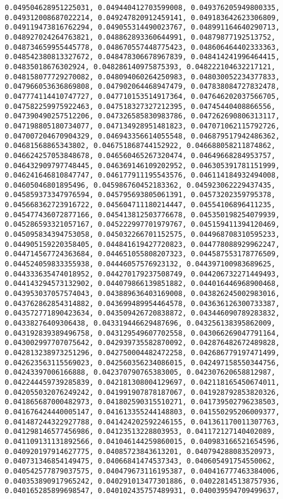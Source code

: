 \documentclass[11pt]{article}
\begin{document}
\begin{Verbatim}[commandchars=\\\{\}]
0.049504628951225031, 0.049440412703599008, 0.049376205949800335, 0.049312008687022214, 0.049247820912459141, 0.049183642623306809, 0.049119473816762294, 0.049055314490023767, 0.048991164640290713, 0.048927024264763821, 0.048862893360644991, 0.04879877192513752, 0.048734659955445778, 0.048670557448775423, 0.048606464402333363, 0.048542380813327672, 0.048478306678967839, 0.048414241996464415, 0.04835018676302924, 0.048286140975875393, 0.048222104632217121, 0.048158077729270082, 0.048094060264250983, 0.048030052234377833, 0.047966053636869808, 0.047902064468947479, 0.047838084727832478, 0.047774114410747727, 0.047710153514917364, 0.047646202037566705, 0.047582259975922463, 0.047518327327212395, 0.04745440408866556, 0.047390490257512206, 0.047326585830983786, 0.047262690806313117, 0.047198805180734077, 0.047134928951481823, 0.047071062115792726, 0.047007204670904329, 0.046943356614055548, 0.046879517942486362, 0.04681568865343802, 0.046751868744152922, 0.046688058211874862, 0.046624257053848678, 0.046560465267320474, 0.04649668284953757, 0.046432909797748445, 0.046369146109202952, 0.046305391781151999, 0.046241646810847747, 0.046177911195543576, 0.046114184932494008, 0.04605046801895496, 0.045986760452183362, 0.045923062229437435, 0.045859373347976594, 0.045795693805061391, 0.04573202359795378, 0.045668362723916722, 0.045604711180214447, 0.04554106896411235, 0.045477436072877166, 0.045413812503776678, 0.045350198254079939, 0.045286593321057167, 0.045222997701979767, 0.045159411394120469, 0.045095834394753058, 0.045032266701152575, 0.044968708310595233, 0.044905159220358405, 0.044841619427720823, 0.044778088929962247, 0.044714567724363684, 0.044651055808207323, 0.044587553178776509, 0.044524059833355938, 0.04446057576923132, 0.044397100983689625, 0.044333635474018952, 0.044270179237508749, 0.044206732271449493, 0.044143294573132902, 0.044079866139851882, 0.044016446968900468, 0.043953037057574043, 0.043889636403169008, 0.043826245002983016, 0.043762862854314882, 0.043699489954464578, 0.043636126300733387, 0.043572771890423634, 0.043509426720838872, 0.043446090789283832, 0.04338276409306438, 0.043319446629487696, 0.043256138395862009, 0.043192839389496758, 0.043129549607702558, 0.043066269047791164, 0.043002997707075642, 0.042939735582870092, 0.042876482672489828, 0.042813238973251296, 0.042750004482472258, 0.042686779197471499, 0.042623563115569023, 0.042560356234086015, 0.042497158550344756, 0.04243397006166888, 0.042370790765383005, 0.042307620658812987, 0.042244459739285839, 0.042181308004129697, 0.042118165450674011, 0.042055032076249242, 0.041991907878187067, 0.041928792853820326, 0.041865687000482973, 0.041802590315510271, 0.041739502796238503, 0.041676424440005147, 0.041613355244148803, 0.041550295206009377, 0.041487244322927788, 0.041424202592246155, 0.041361170011307763, 0.041298146577456986, 0.04123513228803953, 0.041172127140402089, 0.041109131131892566, 0.041046144259860015, 0.040983166521654596, 0.040920197914627775, 0.04085723843613201, 0.040794288083520973, 0.040731346854149475, 0.04066841474537343, 0.040605491754550062, 0.040542577879037575, 0.040479673116195387, 0.040416777463384006, 0.040353890917965242, 0.040291013477301886, 0.040228145138757936, 0.040165285899698547, 0.040102435757489931, 0.040039594709499637, 
\end{Verbatim}
\end{document}
